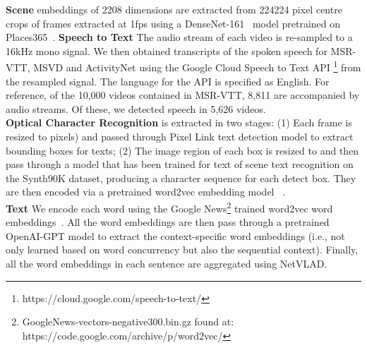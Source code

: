 \documentclass{bmvc2k}
\begin{document}
\textbf{Scene} embeddings of 2208 dimensions are extracted from 224224 pixel centre crops of frames extracted at 1fps using a DenseNet-161~\cite{huang2017densely} model pretrained on Places365~\cite{zhou2017places}.
\textbf{Speech to Text} The audio stream of each video is re-sampled to a 16kHz mono signal. We then obtained transcripts of the spoken speech for MSR-VTT, MSVD and ActivityNet using the Google Cloud Speech to Text API \footnote{https://cloud.google.com/speech-to-text/} from the resampled signal. The language for the API is specified as English. For reference, of the 10,000 videos contained in MSR-VTT, 8,811 are accompanied by audio streams.  Of these, we detected speech in 5,626 videos. \\
\textbf{Optical Character Recognition} is extracted in two stages: (1) Each frame is resized to  pixels) and passed through Pixel Link \cite{deng2018pixellink} text detection model to extract bounding boxes for texts; (2) The image region of each box is resized to  and then pass through a model \cite{liu2018synthetically,shi2017end} that has been trained for text of scene text recognition on the Synth90K dataset\cite{jaderberg2014synthetic}, producing a character sequence for each detect box. They are then encoded via a pretrained word2vec embedding model ~\cite{mikolov2013efficient}.\\
\textbf{Text} We encode each word using the Google News\footnote{
GoogleNews-vectors-negative300.bin.gz found at: https://code.google.com/archive/p/word2vec/} trained word2vec word embeddings~\cite{mikolov2013efficient}. All the word embeddings are then pass through a pretrained OpenAI-GPT model to extract the context-specific word embeddings (i.e., not only learned based on word concurrency but also the sequential context). Finally, all the word embeddings in each sentence are aggregated using NetVLAD. \\
 
\end{document}
